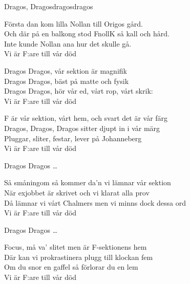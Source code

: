 \begin{song}{Dragos, Dragos}{dragosdragos}

\begin{vers}
Första dan kom lilla Nollan till Origos gård.\\
Och där på en balkong stod FnollK så kall och hård.\\
Inte kunde Nollan ana hur det skulle gå.\\
Vi är F:are till vår död \\
\end{vers}

\begin{vers}
Dragos Dragos, vår sektion är magnifik \\
Dragos Dragos, bäst på matte och fysik \\
Dragos Dragos, hör vår ed, vårt rop, vårt skrik:\\
Vi är F:are till vår död \\
\end{vers}

\begin{vers}
F är vår sektion, vårt hem, och svart det är vår färg\\
Dragos, Dragos, Dragos sitter djupt in i vår märg\\
Pluggar, sliter, festar, lever på Johanneberg\\
Vi är F:are till vår död\\
\end{vers}

\begin{vers}
Dragos Dragos \ldots
\end{vers}

\begin{vers}
Så småningom så kommer da'n vi lämnar vår sektion\\
När exjobbet är skrivet och vi klarat alla prov\\
Då lämnar vi vårt Chalmers men vi minns dock dessa ord\\
Vi är F:are till vår död\\
\end{vers}

\begin{vers}
Dragos Dragos \ldots
\end{vers}
\end{song}

\iffalse

\begin{vers}
Focus, må va' slitet men är F-sektionens hem \\
Där kan vi prokrastinera plugg till klockan fem\\
Om du snor en gaffel så förlorar du en lem \\
Vi är F:are till vår död\\
\end{vers}


